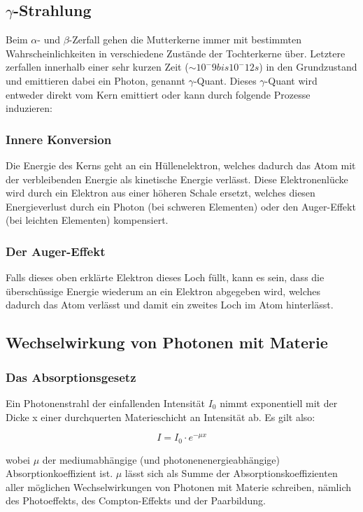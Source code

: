 \subsection{$\gamma$-Strahlung}

Beim $\alpha$- und $\beta$-Zerfall gehen die Mutterkerne immer mit bestimmten Wahrscheinlichkeiten in verschiedene Zustände der Tochterkerne über. Letztere zerfallen innerhalb einer sehr kurzen Zeit ($\sim 10^-9 bis 10^-12 s$) in den Grundzustand und emittieren dabei ein Photon, genannt $\gamma$-Quant. Dieses $\gamma$-Quant wird entweder direkt vom Kern emittiert oder kann durch folgende Prozesse induzieren:

\subsubsection{Innere Konversion}

Die Energie des Kerns geht an ein Hüllenelektron, welches dadurch das Atom mit der verbleibenden Energie als kinetische Energie verlässt. Diese Elektronenlücke wird durch ein Elektron aus einer höheren Schale ersetzt, welches diesen Energieverlust durch ein Photon (bei schweren Elementen) oder den Auger-Effekt (bei leichten Elementen) kompensiert.

\subsubsection{Der Auger-Effekt}

Falls dieses oben erklärte Elektron dieses Loch füllt, kann es sein, dass die überschüssige Energie wiederum an ein Elektron abgegeben wird, welches dadurch das Atom verlässt und damit ein zweites Loch im Atom hinterlässt.


\subsection{Wechselwirkung von Photonen mit Materie}

\subsubsection{Das Absorptionsgesetz}

Ein Photonenstrahl der einfallenden Intensität $I_0$ nimmt exponentiell mit der Dicke x einer durchquerten Materieschicht an Intensität ab. Es gilt also:

$$ I = I_0\cdot e^{-\mu x} $$

wobei $\mu$ der mediumabhängige (und photonenenergieabhängige) Absorptionkoeffizient ist. $\mu$ lässt sich als Summe der Absorptionskoeffizienten aller möglichen Wechselwirkungen von Photonen mit Materie schreiben, nämlich des Photoeffekts, des Compton-Effekts und der Paarbildung.

